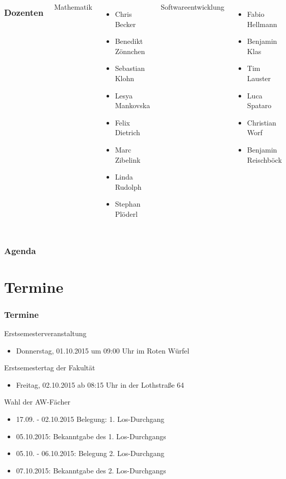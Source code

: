 \documentclass{beamer}
\begin{document}
	\begin{frame}
		\begin{columns}[t]
			\frametitle{Dozenten}
			Mathematik
			\begin{itemize}
				\item Chris Becker
				\item Benedikt Zönnchen
				\item Sebastian Klohn
				\item Lesya Mankovska
				\item Felix Dietrich
				\item Marc Zibelink
				\item Linda Rudolph
				\item Stephan Plöderl
			\end{itemize}
			Softwareentwicklung
			\begin{itemize}
				\item Fabio Hellmann
				\item Benjamin Klas
				\item Tim Lauster
				\item Luca Spataro
				\item Christian Worf
				\item Benjamin Reischböck
			\end{itemize}
		\end{columns}
	\end{frame}
	
	\begin{frame}
		\frametitle{Agenda}
		\tableofcontents
	\end{frame}
	
	\section{Termine}
	\begin{frame}
		\frametitle{Termine}
		Erstsemesterveranstaltung
		\begin{itemize}
			\item Donnerstag, 01.10.2015 um 09:00 Uhr im Roten Würfel
		\end{itemize}
		\pause
		Erstsemestertag der Fakultät
		\begin{itemize}
			\item Freitag, 02.10.2015 ab 08:15 Uhr in der Lothstraße 64
		\end{itemize}
		\pause
		Wahl der AW-Fächer
		\begin{itemize}
			\item 17.09. - 02.10.2015 Belegung: 1. Los-Durchgang
			\item 05.10.2015: Bekanntgabe des 1. Los-Durchgangs
			\item 05.10. - 06.10.2015: Belegung 2. Los-Durchgang
			\item 07.10.2015: Bekanntgabe des 2. Los-Durchgangs
		\end{itemize}
	\end{frame}
	
\end{document}
